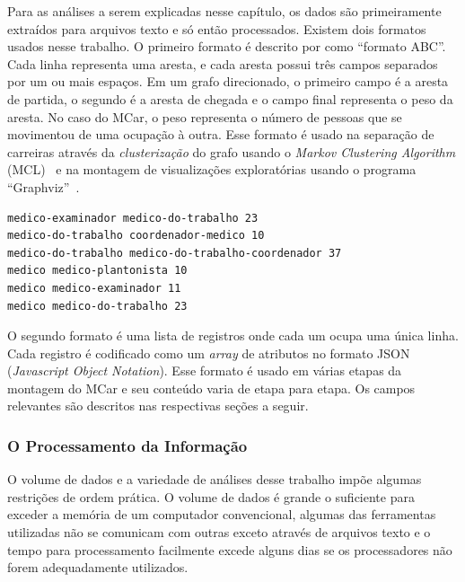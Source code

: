 \documentclass[12pt,a4paper]{article}
\begin{document}
Para as análises a serem explicadas nesse capítulo, os dados são primeiramente extraídos para arquivos texto e só então processados. Existem dois formatos usados nesse trabalho. O primeiro formato é descrito por  como \enquote{formato ABC}. Cada linha representa uma aresta, e cada aresta possui três campos separados por um ou mais espaços. Em um grafo direcionado, o primeiro campo é a aresta de partida, o segundo é a aresta de chegada e o campo final representa o peso da aresta. No caso do MCar, o peso representa o número de pessoas que se movimentou de uma ocupação à outra. Esse formato é usado na separação de carreiras através da \textit{clusterização} do grafo usando o \textit{Markov Clustering Algorithm} (MCL)~\cite{Van_Dongen2000-qm} e na montagem de visualizações exploratórias usando o programa \enquote{Graphviz}~\cite{Gansner2000-oo}.

\vspace{\abovedisplayskip}

\noindent
\begin{minipage}{\linewidth}
\begin{lstlisting}[frame=single,caption=Arquivo em Formato ABC,label=lst:formato-abc,captionpos=b]
medico-examinador medico-do-trabalho 23
medico-do-trabalho coordenador-medico 10
medico-do-trabalho medico-do-trabalho-coordenador 37
medico medico-plantonista 10
medico medico-examinador 11
medico medico-do-trabalho 23
\end{lstlisting}
\end{minipage}

O segundo formato é uma lista de registros onde cada um ocupa uma única linha. Cada registro é codificado como um \textit{array} de atributos no formato JSON (\textit{Javascript Object Notation}). Esse formato é usado em várias etapas da montagem do MCar e seu conteúdo varia de etapa para etapa. Os campos relevantes são descritos nas respectivas seções a seguir.

\subsubsection{O Processamento da Informação}

O volume de dados e a variedade de análises desse trabalho impõe algumas restrições de ordem prática. O volume de dados é grande o suficiente para exceder a memória de um computador convencional, algumas das ferramentas utilizadas não se comunicam com outras exceto através de arquivos texto e o tempo para processamento facilmente excede alguns dias se os processadores não forem adequadamente utilizados.
\end{document}
